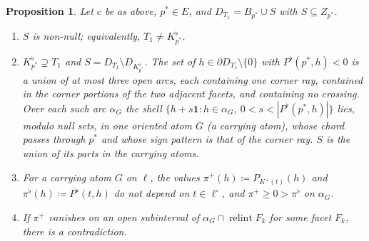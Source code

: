 \documentclass[11pt]{article}
\newtheorem{proposition}[theorem]{Proposition}
\theoremstyle{definition}
\theoremstyle{remark}
\newcommand{\one}{\mathbf 1}
\newcommand{\relint}{\operatorname{relint}}
\begin{document}
\begin{proposition}\label{prop:carrying}
Let $c$ be as above, $p^*\in E$, and $D_{T_1}=B_{p^*}\cup S$ with $S\subseteq Z_{p^*}$.
\begin{enumerate}[leftmargin=*,label=(\alph*)]
\item $S$ is non-null; equivalently, $T_1\ne K^\flat_{p^*}$.
\item $K^\flat_{p^*}\supsetneq T_1$ and $S=D_{T_1}\setminus D_{K^\flat_{p^*}}$. The set of $h\in\partial D_{T_1}\setminus\{0\}$ with $P^\flat(p^*,h)<0$ is a union of at most three open arcs, each containing one corner ray, contained in the corner portions of the two adjacent facets, and containing no crossing. Over each such arc $\alpha_G$ the shell $\{h+s\one:h\in\alpha_G,\ 0<s<|P^\flat(p^*,h)|\}$ lies, modulo null sets, in one oriented atom $G$ (a \emph{carrying atom}), whose chord passes through $p^*$ and whose sign pattern is that of the corner ray. $S$ is the union of its parts in the carrying atoms.
\item For a carrying atom $G$ on $\ell$, the values $\pi^+(h)\coloneqq P_{K^+(t)}(h)$ and $\pi^\flat(h)\coloneqq P^\flat(t,h)$ do not depend on $t\in\ell^\circ$, and $\pi^+\ge0>\pi^\flat$ on $\alpha_G$.
\item If $\pi^+$ vanishes on an open subinterval of $\alpha_G\cap\relint F_k$ for some facet $F_k$, there is a contradiction.
\end{enumerate}
\end{proposition}
\end{document}
